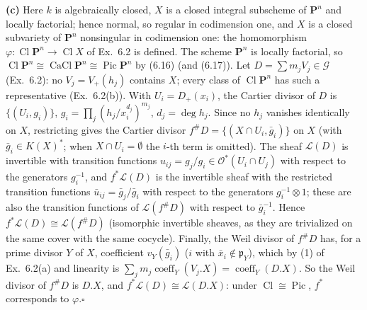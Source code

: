 \documentclass[11pt]{article}
\begin{document}
\textbf{(c)} Here $k$ is algebraically closed, $X$ is a closed integral subscheme of $\mathbf P^n$ and locally factorial; hence normal, so regular in codimension one, and $X$ is a closed subvariety of $\mathbf P^n$ nonsingular in codimension one: the homomorphism $\varphi:\operatorname{Cl}\mathbf P^n\to\operatorname{Cl}X$ of Ex.~6.2 is defined. The scheme $\mathbf P^n$ is locally factorial, so $\operatorname{Cl}\mathbf P^n\cong\operatorname{CaCl}\mathbf P^n\cong\operatorname{Pic}\mathbf P^n$ by (6.16) (and (6.17)). Let $D=\sum m_jV_j\in\mathcal G$ (Ex.~6.2): no $V_j=V_+(h_j)$ contains $X$; every class of $\operatorname{Cl}\mathbf P^n$ has such a representative (Ex.~6.2(b)). With $U_i=D_+(x_i)$, the Cartier divisor of $D$ is $\{(U_i,g_i)\}$, $g_i=\prod_j(h_j/x_i^{d_j})^{m_j}$, $d_j=\deg h_j$. Since no $h_j$ vanishes identically on $X$, restricting gives the Cartier divisor $f^\#D=\{(X\cap U_i,\bar g_i)\}$ on $X$ (with $\bar g_i\in K(X)^*$; when $X\cap U_i=\emptyset$ the $i$-th term is omitted). The sheaf $\mathcal L(D)$ is invertible with transition functions $u_{ij}=g_j/g_i\in\mathcal O^*(U_i\cap U_j)$ with respect to the generators $g_i^{-1}$, and $f^*\mathcal L(D)$ is the invertible sheaf with the restricted transition functions $\bar u_{ij}=\bar g_j/\bar g_i$ with respect to the generators $g_i^{-1}\otimes1$; these are also the transition functions of $\mathcal L(f^\#D)$ with respect to $\bar g_i^{-1}$. Hence $f^*\mathcal L(D)\cong\mathcal L(f^\#D)$ (isomorphic invertible sheaves, as they are trivialized on the same cover with the same cocycle). Finally, the Weil divisor of $f^\#D$ has, for a prime divisor $Y$ of $X$, coefficient $v_Y(\bar g_i)$ ($i$ with $\bar x_i\notin\mathfrak p_Y$), which by (1) of Ex.~6.2(a) and linearity is $\sum_jm_j\operatorname{coeff}_Y(V_j.X)=\operatorname{coeff}_Y(D.X)$. So the Weil divisor of $f^\#D$ is $D.X$, and $f^*\mathcal L(D)\cong\mathcal L(D.X)$: under $\operatorname{Cl}\cong\operatorname{Pic}$, $f^*$ corresponds to $\varphi$.\hfill$\square$
\end{document}
